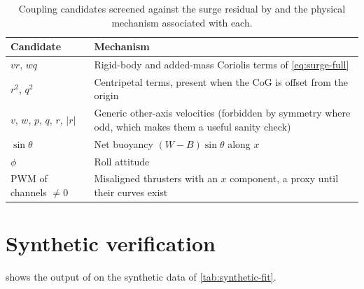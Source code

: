 \begin{table}[htbp]
\centering
\caption{Coupling candidates screened against the surge residual by 
and the physical mechanism associated with each.}
\label{tab:candidates}
\small
\begin{tabularx}{\textwidth}{@{}l X@{}}
\toprule
Candidate & Mechanism \\
\midrule
$vr$, $wq$ & Rigid-body and added-mass Coriolis terms of \eqref{eq:surge-full} \\
$r^2$, $q^2$ & Centripetal terms, present when the CoG is offset from the origin \\
$v$, $w$, $p$, $q$, $r$, $|r|$ & Generic other-axis velocities (forbidden by symmetry where odd, which makes them a useful sanity check) \\
$\sin\theta$ & Net buoyancy $(W-B)\sin\theta$ along $x$ \\
$\phi$ & Roll attitude \\
PWM of channels $\neq 0$ & Misaligned thrusters with an $x$ component, a proxy until their curves exist \\
\bottomrule
\end{tabularx}
\end{table}
\FloatBarrier

\section{Synthetic verification}

 shows the output of  on the synthetic data of
\cref{tab:synthetic-fit}.

